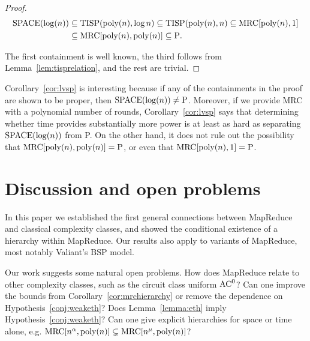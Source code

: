 \documentclass[11pt]{article}
\theoremstyle{definition}
\theoremstyle{remark}
\newcommand{\mrc}{\textup{MRC}}
\newcommand{\TISP}{\textup{TISP}}
\renewcommand{\P}{\textup{P}}
\renewcommand{\L}{\textup{SPACE}(\log(n))}
\begin{document}
\begin{proof}
\begin{align*}	\L &\subseteq \TISP(\textup{poly}(n), \log n) \subseteq
\TISP(\textup{poly}(n), n) \subseteq \mrc[\textup{poly}(n), 1] \\ &\subseteq
\mrc[\textup{poly}(n), \textup{poly}(n)] \subseteq \P.\end{align*}

The first containment is well known, the third follows from 
Lemma~\ref{lem:tisprelation}, and the rest are trivial.
\end{proof}

Corollary~\ref{cor:lvsp} is interesting because if any of the containments in
the proof are shown to be proper, then $\L \neq \P$. Moreover, if we provide
MRC with a polynomial number of rounds, Corollary~\ref{cor:lvsp} says that
determining whether time provides substantially more power is at least as hard
as separating $\L$ from P. On the other hand, it does not rule out the possibility
that $\mrc[\textup{poly}(n), \textup{poly}(n)] = \P$, or even that
$\mrc[\textup{poly}(n), 1] = \P$.

\section{Discussion and open problems}\label{sec:openproblems}

In this paper we established the first general connections between MapReduce
and classical complexity classes, and showed the conditional existence of a
hierarchy within MapReduce. Our results also apply to variants of MapReduce,
most notably Valiant's BSP model.  


Our work suggests some natural open problems. How does MapReduce relate to
other complexity classes, such as the circuit class uniform $\textup{AC}^0$?
Can one improve the bounds from Corollary~\ref{cor:mrchierarchy} or remove the
dependence on Hypothesis~\ref{conj:weaketh}? Does Lemma~\ref{lemma:eth} imply
Hypothesis~\ref{conj:weaketh}? Can one give explicit hierarchies for space or
time alone, e.g. $\mrc[n^\alpha, \text{poly}(n)] \subsetneq \mrc[n^\mu,
\text{poly}(n)]$?
\end{document}

